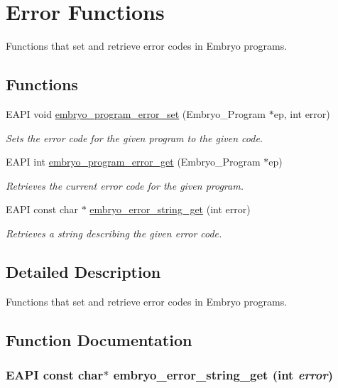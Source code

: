 \hypertarget{group__Embryo__Error__Group}{
\section{Error Functions}
\label{group__Embryo__Error__Group}
}
Functions that set and retrieve error codes in Embryo programs.  
\subsection*{Functions}
\begin{CompactItemize}
\item 
EAPI void \hyperlink{group__Embryo__Error__Group_g3d331b8571f05d5893e02aa3561c27cf}{embryo\_\-program\_\-error\_\-set} (Embryo\_\-Program $\ast$ep, int error)
\begin{CompactList}\small\item\em Sets the error code for the given program to the given code. \item\end{CompactList}\item 
EAPI int \hyperlink{group__Embryo__Error__Group_g0f7550fc4564d7ccda4ddb7d4e96432e}{embryo\_\-program\_\-error\_\-get} (Embryo\_\-Program $\ast$ep)
\begin{CompactList}\small\item\em Retrieves the current error code for the given program. \item\end{CompactList}\item 
EAPI const char $\ast$ \hyperlink{group__Embryo__Error__Group_g9ebc58d5e5d534116773ae23db795fd2}{embryo\_\-error\_\-string\_\-get} (int error)
\begin{CompactList}\small\item\em Retrieves a string describing the given error code. \item\end{CompactList}\end{CompactItemize}


\subsection{Detailed Description}
Functions that set and retrieve error codes in Embryo programs. 



\subsection{Function Documentation}
\hypertarget{group__Embryo__Error__Group_g9ebc58d5e5d534116773ae23db795fd2}{
\subsubsection{\setlength{\rightskip}{0pt plus 5cm}EAPI const char$\ast$ embryo\_\-error\_\-string\_\-get (int {\em error})}}
\label{group__Embryo__Error__Group_g9ebc58d5e5d534116773ae23db795fd2}



